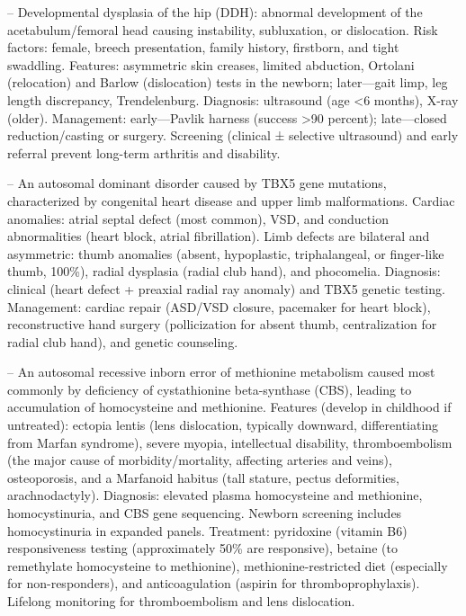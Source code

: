 -- Developmental dysplasia of the hip (DDH): abnormal development of the acetabulum/femoral head causing instability, subluxation, or dislocation. Risk factors: female, breech presentation, family history, firstborn, and tight swaddling. Features: asymmetric skin creases, limited abduction, Ortolani (relocation) and Barlow (dislocation) tests in the newborn; later—gait limp, leg length discrepancy, Trendelenburg. Diagnosis: ultrasound (age <6 months), X-ray (older). Management: early—Pavlik harness (success >90 percent); late—closed reduction/casting or surgery. Screening (clinical ± selective ultrasound) and early referral prevent long-term arthritis and disability.

-- An autosomal dominant disorder caused by TBX5 gene mutations, characterized by congenital heart disease and upper limb malformations. Cardiac anomalies: atrial septal defect (most common), VSD, and conduction abnormalities (heart block, atrial fibrillation). Limb defects are bilateral and asymmetric: thumb anomalies (absent, hypoplastic, triphalangeal, or finger-like thumb, 100\%), radial dysplasia (radial club hand), and phocomelia. Diagnosis: clinical (heart defect + preaxial radial ray anomaly) and TBX5 genetic testing. Management: cardiac repair (ASD/VSD closure, pacemaker for heart block), reconstructive hand surgery (pollicization for absent thumb, centralization for radial club hand), and genetic counseling.

-- An autosomal recessive inborn error of methionine metabolism caused most commonly by deficiency of cystathionine beta-synthase (CBS), leading to accumulation of homocysteine and methionine. Features (develop in childhood if untreated): ectopia lentis (lens dislocation, typically downward, differentiating from Marfan syndrome), severe myopia, intellectual disability, thromboembolism (the major cause of morbidity/mortality, affecting arteries and veins), osteoporosis, and a Marfanoid habitus (tall stature, pectus deformities, arachnodactyly). Diagnosis: elevated plasma homocysteine and methionine, homocystinuria, and CBS gene sequencing. Newborn screening includes homocystinuria in expanded panels. Treatment: pyridoxine (vitamin B6) responsiveness testing (approximately 50\% are responsive), betaine (to remethylate homocysteine to methionine), methionine-restricted diet (especially for non-responders), and anticoagulation (aspirin for thromboprophylaxis). Lifelong monitoring for thromboembolism and lens dislocation.

